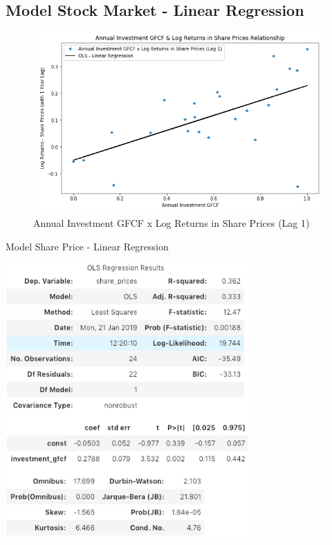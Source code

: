 \documentclass{elsarticle}
\begin{document}
\subsection{Model Stock Market - Linear Regression}
\begin{figure}[H]
    \centering
    \includegraphics[width=1\textwidth]{images/scatter_2.png}
    \caption{Annual Investment GFCF x Log Returns in Share Prices (Lag 1)}
    \label{fig:Annual Investment GFCF x Log Returns in Share Prices (Lag 1)}
\end{figure}

\begin{table}[H]
  \centering
  \caption{Model Share Price - Linear Regression}
  \includegraphics[width=0.7\textwidth]{images/ols_2.png}
\end{table}
\end{document}
